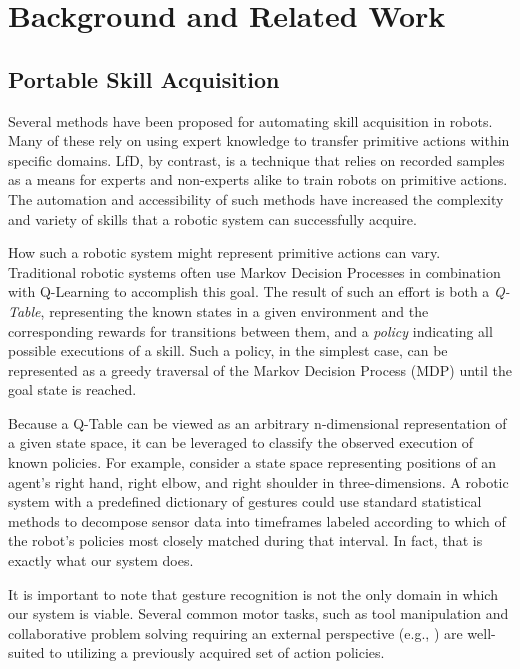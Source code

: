 \documentclass[letterpaper]{article}
\begin{document}
\section{Background and Related Work}
\label{sec:background}
\subsection{Portable Skill Acquisition}
  Several methods have been proposed for automating skill acquisition in robots.  Many of these rely on using expert knowledge to transfer primitive actions within specific domains. LfD, by contrast, is a technique that relies on recorded samples as a means for experts and non-experts alike to train robots on primitive actions.  The automation and accessibility of such methods have increased the complexity and variety of skills that a robotic system can successfully acquire.

  How such a robotic system might represent primitive actions can vary.  Traditional robotic systems often use Markov Decision Processes in combination with Q-Learning to accomplish this goal.  The result of such an effort is both a \textit{Q-Table}, representing the known states in a given environment and the corresponding rewards for transitions between them, and a \textit{policy} indicating all possible executions of a skill.  Such a policy, in the simplest case, can be represented as a greedy traversal of the Markov Decision Process (MDP) until the goal state is reached.

  Because a Q-Table can be viewed as an arbitrary n-dimensional representation of a given state space, it can be leveraged to classify the observed execution of known policies.  For example, consider a state space representing positions of an agent's right hand, right elbow, and right shoulder in three-dimensions.  A robotic system with a predefined dictionary of gestures could use standard statistical methods to decompose sensor data into timeframes labeled according to which of the robot's policies most closely matched during that interval.  In fact, that is exactly what our system does.

  It is important to note that gesture recognition is not the only domain in which our system is viable.  Several common motor tasks, such as tool manipulation and collaborative problem solving requiring an external perspective (e.g., \citeauthor{HRITraftonPerspective} \citeyear{HRITraftonPerspective}) are well-suited to utilizing a previously acquired set of action policies.
\end{document}
